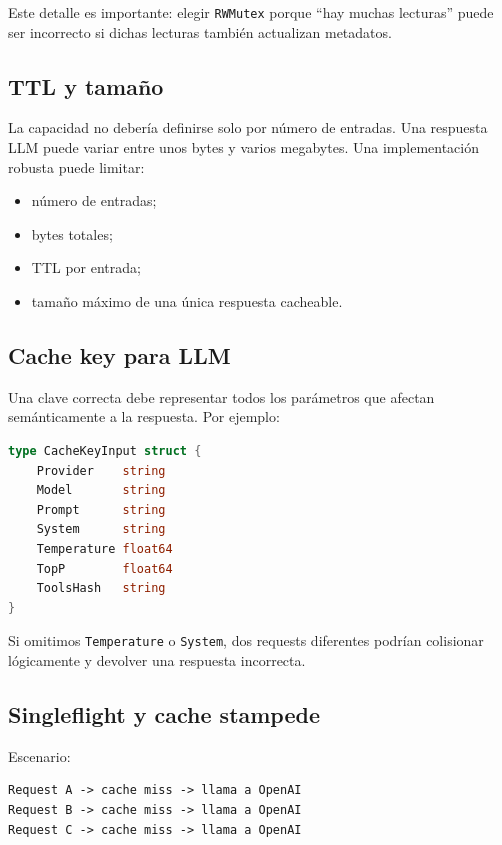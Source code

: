 \documentclass[11pt,a4paper]{article}
\newcommand{\code}[1]{\texttt{#1}}
\begin{document}
Este detalle es importante: elegir \code{RWMutex} porque ``hay muchas lecturas'' puede ser incorrecto si dichas lecturas también actualizan metadatos.

\subsection{TTL y tamaño}

La capacidad no debería definirse solo por número de entradas. Una respuesta LLM puede variar entre unos bytes y varios megabytes. Una implementación robusta puede limitar:

\begin{itemize}
  \item número de entradas;
  \item bytes totales;
  \item TTL por entrada;
  \item tamaño máximo de una única respuesta cacheable.
\end{itemize}

\subsection{Cache key para LLM}

Una clave correcta debe representar todos los parámetros que afectan semánticamente a la respuesta. Por ejemplo:

\begin{lstlisting}[language=Go,caption={Modelo conceptual de clave de caché}]
type CacheKeyInput struct {
    Provider    string
    Model       string
    Prompt      string
    System      string
    Temperature float64
    TopP        float64
    ToolsHash   string
}
\end{lstlisting}

Si omitimos \code{Temperature} o \code{System}, dos requests diferentes podrían colisionar lógicamente y devolver una respuesta incorrecta.

\subsection{Singleflight y cache stampede}

Escenario:

\begin{verbatim}
Request A -> cache miss -> llama a OpenAI
Request B -> cache miss -> llama a OpenAI
Request C -> cache miss -> llama a OpenAI
\end{verbatim}
\end{document}
